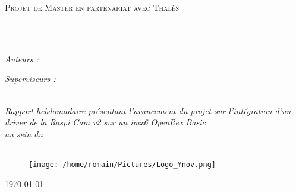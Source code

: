 \documentclass[
	11pt, %
	french, %
	singlespacing, %
	headsepline, %
	]{MastersDoctoralThesis} %
\begin{document}
	\begin{titlepage}
	\begin{center}
	
	\vspace*{.06\textheight}
	{\scshape\LARGE \univname\par}\vspace{1.5cm} %
	\textsc{\Large Projet de Master en partenariat avec Thalès}\\[0.5cm] %
	
	\HRule \\[0.4cm] %
	{\huge \bfseries \ttitle\par}\vspace{0.4cm} %
	\HRule \\[1.5cm] %
	 
	\begin{minipage}[t]{0.4\textwidth}
	\begin{flushleft} \large
	\emph{Auteurs :}\\
	\authorname %
	\end{flushleft}
	\end{minipage}
	\begin{minipage}[t]{0.4\textwidth}
	\begin{flushright} \large
	\emph{Superviseurs :} \\
	\supname %
	\end{flushright}
	\end{minipage}\\[2.5cm]
	
	\large \textit{Rapport hebdomadaire présentant l'avancement du projet sur l'intégration
	 d'un driver de la Raspi Cam v2 sur un imx6 OpenRex Basic}\\[0.3cm] %
	\textit{au sein du}\\[0.7cm]
	\deptname \\ [0.5cm]
	 
	\begin{figure}[!htb]
			\centering
			\texttt{[image: /home/romain/Pictures/Logo\_Ynov.png]}
	\end{figure}

	{\large \today}\\[4cm] %
	 
	\vfill
	\end{center}
	\end{titlepage}
	
\end{document}

